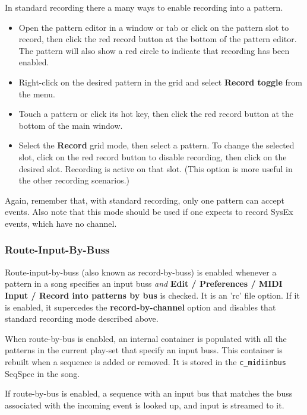    In standard recording there a many ways to enable recording into
   a pattern.

   \begin{itemize}
      \item Open the pattern editor in a window or tab or click on the
         pattern slot to record, then click the red record
         button at the bottom of the pattern editor.
         The pattern will also
         show a red circle to indicate that recording has been enabled.
      \item Right-click on the desired pattern in the grid and select
         \textbf{Record toggle} from the menu.
      \item Touch a pattern or click its hot key, then
         click the red record button at the bottom of the main window.
      \item Select the \textbf{Record} grid mode, then select a pattern.
         To change the selected slot, click on the red record button
         to disable recording, then click on the desired slot.
         Recording is active on that slot.
         (This option is more useful in the other recording scenarios.)
   \end{itemize}

   Again, remember that, with standard recording, only one pattern can
   accept events.
   Also note that this mode should be used if one
   expects to record SysEx events, which have no channel.

\subsubsection{Route-Input-By-Buss}
\label{subsubsec:recording_route_by_buss}

   Route-input-by-buss (also known as record-by-buss)
   is enabled whenever a pattern in a song specifies an
   input buss \textsl{and}
   \textbf{Edit / Preferences / MIDI Input / Record into patterns by
   bus} is checked. It is an 'rc' file option.
   If it is enabled, it supercedes the
   \textbf{record-by-channel} option and
   disables that standard recording mode described above.

   When route-by-bus is enabled, an internal container is populated with
   all the patterns in the current play-set that specify an input buss.
   This container is rebuilt when a sequence is added or removed.
   It is stored in the \texttt{c\_midiinbus} SeqSpec in the song.

   If route-by-bus is enabled, a sequence with an input bus that matches the
   buss associated with the incoming event is looked up, and input is
   streamed to it.

